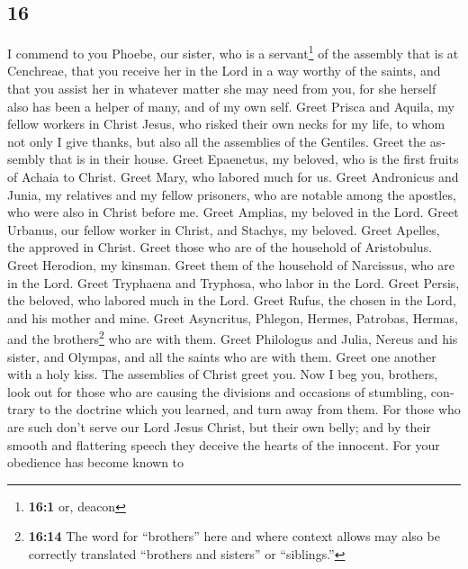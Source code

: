 \begin{paracol}{2}
\begin{otherlanguage}{english}
\hypertarget{section-31}{%
\section{16}\label{section-31}}

 I commend to you Phoebe, our sister, who is a
servant\footnote{\textbf{16:1} or, deacon} of the assembly that is at
Cenchreae,  that you receive her in the Lord in a way
worthy of the saints, and that you assist her in whatever matter she may
need from you, for she herself also has been a helper of many, and of my
own self.  Greet Prisca and Aquila, my fellow workers in
Christ Jesus,  who risked their own necks for my life, to
whom not only I give thanks, but also all the assemblies of the
Gentiles.  Greet the assembly that is in their house.
Greet Epaenetus, my beloved, who is the first fruits of Achaia to
Christ.  Greet Mary, who labored much for us.
 Greet Andronicus and Junia, my relatives and my fellow
prisoners, who are notable among the apostles, who were also in Christ
before me.  Greet Amplias, my beloved in the Lord.
 Greet Urbanus, our fellow worker in Christ, and Stachys,
my beloved.  Greet Apelles, the approved in Christ. Greet
those who are of the household of Aristobulus.  Greet
Herodion, my kinsman. Greet them of the household of Narcissus, who are
in the Lord.  Greet Tryphaena and Tryphosa, who labor in
the Lord. Greet Persis, the beloved, who labored much in the Lord.
 Greet Rufus, the chosen in the Lord, and his mother and
mine.  Greet Asyncritus, Phlegon, Hermes, Patrobas,
Hermas, and the brothers\footnote{\textbf{16:14} The word for
  ``brothers'' here and where context allows may also be correctly
  translated ``brothers and sisters'' or ``siblings.''} who are with
them.  Greet Philologus and Julia, Nereus and his sister,
and Olympas, and all the saints who are with them.  Greet
one another with a holy kiss. The assemblies of Christ greet you.
 Now I beg you, brothers, look out for those who are
causing the divisions and occasions of stumbling, contrary to the
doctrine which you learned, and turn away from them.  For
those who are such don't serve our Lord Jesus Christ, but their own
belly; and by their smooth and flattering speech they deceive the hearts
of the innocent.  For your obedience has become known to

\end{otherlanguage}
\end{paracol}
